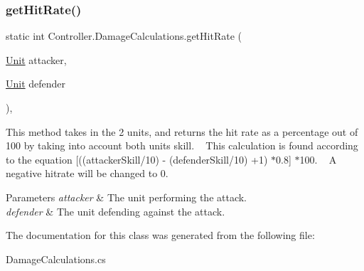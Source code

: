 \subsubsection{\texorpdfstring{get\+Hit\+Rate()}{getHitRate()}}
{\footnotesize\ttfamily static int Controller.\+Damage\+Calculations.\+get\+Hit\+Rate (\begin{DoxyParamCaption}\item[{\hyperlink{interface_model_1_1_unit_module_1_1_unit}{Unit}}]{attacker,  }\item[{\hyperlink{interface_model_1_1_unit_module_1_1_unit}{Unit}}]{defender }\end{DoxyParamCaption})\hspace{0.3cm}{\ttfamily [inline]}, {\ttfamily [static]}}

This method takes in the 2 units, and returns the hit rate as a percentage out of 100 by taking into account both unit\textquotesingle{}s skill. ~\newline
This calculation is found according to the equation \mbox{[}((attacker\+Skill/10) -\/ (defender\+Skill/10) +1) $\ast$0.8\mbox{]} $\ast$100. ~\newline
A negative hitrate will be changed to 0. 
\begin{DoxyParams}{Parameters}
{\em attacker} & The unit performing the attack. \\
\hline
{\em defender} & The unit defending against the attack. \\
\hline
\end{DoxyParams}


The documentation for this class was generated from the following file\+:\begin{DoxyCompactItemize}
\item 
Damage\+Calculations.\+cs\end{DoxyCompactItemize}
